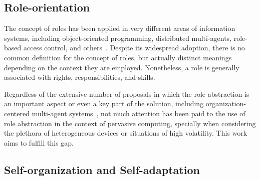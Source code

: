 
\subsection{Role-orientation}



The concept of roles has been applied in very different areas of information systems, including object-oriented programming, distributed multi-agents, role-based access control, and others~\cite{}. Despite its widespread adoption, there is no common definition for the concept of roles, but actually distinct meanings depending on the context they are employed. Nonetheless, a role is generally associated with rights, responsibilities, and skills.

Regardless of the extensive number of proposals in which the role abstraction is an important aspect or even a key part of the solution, including organization-centered multi-agent systems~\cite{}, not much attention has been paid to the use of role abstraction in the context of pervasive computing, specially when considering the plethora of heterogeneous devices or situations of high volatility. This work aims to fulfill this gap. %



\subsection{Self-organization and Self-adaptation}

